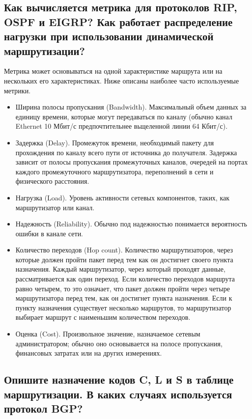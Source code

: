 \subsection{Как вычисляется метрика для протоколов RIP, OSPF и EIGRP?
	Как работает распределение нагрузки
	при использовании динамической маршрутизации?}

Метрика может основываться на одной характеристике маршрута или на нескольких его характеристиках. Ниже описаны наиболее часто используемые метрики.

\begin{itemize}
	\item Ширина полосы пропускания (Bandwidth).
		Максимальный объем данных за единицу времени,
		которые могут передаваться по каналу
		(обычно канал Ethernet 10 Мбит/с предпочтительнее вьщеленной
		линии 64 Кбит/с).
	\item Задержка (Delay). Промежуток времени, необходимый пакету
		для прохождения по каналу всего пути от источника до получателя.
		Задержка зависит от полосы пропускания промежуточных каналов,
		очередей на портах каждого промежуточного маршрутизатора,
		переполнений в сети и физического расстояния.
	\item Нагрузка (Load). Уровень активности сетевых компонентов, таких,
		как маршрутизатор или канал.
	\item Надежность (Reliability). Обычно под надежностью понимается
		вероятность ошибки в канале сети.
	\item Количество переходов (Hop count). Количество маршрутизаторов,
		через которые должен пройти пакет перед тем как он достигнет своего
		пункта назначения. Каждый маршрутизатор, через который проходят
		данные, рассматривается как один переход.
		Если количество переходов маршрута равно четырем, то это означает,
		что пакет должен пройти через четыре маршрутизатора перед тем,
		как он достигнет пункта назначения. Если к пункту назначения
		существует несколько маршрутов, то маршрутизатор выбирает маршрут
		с наименьшим количеством переходов.
	\item Оценка (Cost). Произвольное значение, назначаемое сетевым
		администратором; обычно оно основывается на полосе пропускания,
		финансовых затратах или на других измерениях.
\end{itemize}

\subsection{Опишите назначение кодов C, L и S в таблице маршрутизации.
	В каких случаях используется протокол BGP?}

